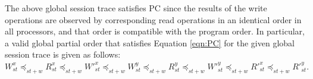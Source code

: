 \documentclass[journal, compsoc]{IEEEtran}
\begin{document}
	
	The above global session trace satisfies PC %
	since the results of the write operations are observed by corresponding read operations in an identical order in all processors, and that order is compatible with the program order. In particular, a valid global partial order that satisfies Equation \ref{eqn:PC} for the given global session trace is given as follows: 
	$W^x_{\mathit{st}}  \preccurlyeq_{\mathit{st}+w} R^x_{\mathit{st}} \preccurlyeq_{\mathit{st}+w} W'^x_{\mathit{st}} \preccurlyeq_{\mathit{st}+w} W^y_{\mathit{st}} \preccurlyeq_{\mathit{st}+w}   R^y_{\mathit{st}} \preccurlyeq_{\mathit{st}+w} W'^y_{\mathit{st}}   \preccurlyeq_{\mathit{st}+w} R'^x_{\mathit{st}} \preccurlyeq_{\mathit{st}+w} R'^y_{\mathit{st}} .$ 
	
\end{document}
